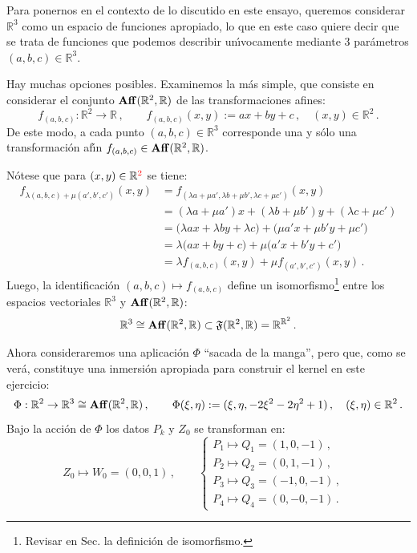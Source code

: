 \smallskip\noindent
Para ponernos en el contexto de lo discutido en este ensayo,
queremos considerar $\mathbb{R}^3$ como un espacio de funciones
apropiado, lo que en este caso quiere decir que se trata de
funciones que podemos describir un\'\i vocamente mediante 3
par\'ametros $(a,b,c)\in\mathbb{R}^3$.

\smallskip\noindent
Hay muchas opciones posibles.
Examinemos la m\'as simple, que consiste en considerar el conjunto
${\rm\bf Aff}(\mathbb{R}^2,\mathbb{R})$ de las transformaciones afines:
$$
f_{(a,b,c)}:\mathbb{R}^2\to\mathbb{R}\,,\qquad
f_{(a,b,c)}(x,y):= ax+by+c\,,\quad (x,y)\in\mathbb{R}^2\,.
$$
De este modo, a cada punto $(a,b,c)\in\mathbb{R}^3$ corresponde una
y s\'olo una transformaci\'on af\'\i n
$f_{(a,b,c)}\in{\rm\bf Aff}(\mathbb{R}^2,\mathbb{R})$.

\smallskip\noindent
N\'otese que para $(x,y)\in\mathbb{R}^{\textcolor{red}{2}}$ se tiene:
\begin{align*}
f_{\lambda(a,b,c)+\mu(a',b',c')}(x,y)
&= f_{(\lambda a + \mu a',\lambda b + \mu b',\lambda c + \mu c')}(x,y) \\
&= (\lambda a + \mu a')x + (\lambda b + \mu b')y + (\lambda c + \mu c') \\
&= \big( \lambda a x + \lambda b y + \lambda c \big) +
   \big( \mu a' x + \mu b' y + \mu c' \big) \\
&= \lambda \big( a x + b y + c \big) + \mu \big( a' x + b' y + c' \big) \\
&= \lambda f_{(a,b,c)}(x,y) + \mu f_{(a',b',c')}(x,y)\,.
\end{align*}
Luego, la identificaci\'on $(a,b,c)\mapsto f_{(a,b,c)}$ define un
isomorfismo\footnote{Revisar en Sec. \label{sec:def} la definici\'on de isomorfismo.} entre los espacios vectoriales $\mathbb{R}^3$ y
${\rm\bf Aff}(\mathbb{R}^2,\mathbb{R})$:
$$
\mathbb{R}^3 \cong {\rm\bf Aff}(\mathbb{R}^2,\mathbb{R})
\subset \mathfrak{F}(\mathbb{R}^2,\mathbb{R})
= \mathbb{R}^{\mathbb{R}^2}\,.
$$

\smallskip\noindent
Ahora consideraremos una aplicaci\'on $\Phi$ ``sacada de la manga'',
pero que, como se ver\'a, constituye una inmersi\'on apropiada
para construir el kernel en este ejercicio:
$$
\Phi:\mathbb{R}^2\to\mathbb{R}^3 \cong 
{\rm\bf Aff}(\mathbb{R}^2,\mathbb{R})\,,\qquad
\Phi(\xi,\eta):= (\xi,\eta, -2\xi^2-2\eta^2+1)\,,\quad 
(\xi,\eta)\in\mathbb{R}^2\,.
$$
Bajo la acci\'on de $\Phi$ los datos $P_k$ y $Z_0$ se transforman en:
\begin{equation*}
Z_0\mapsto W_0 = (0,0,1)\,,\qquad
\begin{cases}
P_1\mapsto Q_1 = (1,0,-1)\,, & \\
P_2\mapsto Q_2 = (0,1,-1)\,, & \\
P_3\mapsto Q_3 = (-1,0,-1)\,, & \\
P_4\mapsto Q_4 = (0,-0,-1)\,. &
\end{cases}
\end{equation*}


